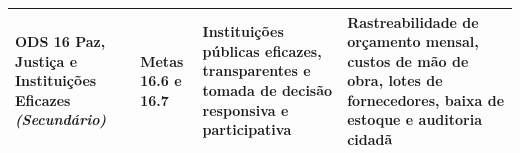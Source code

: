 \begin{table}[htb]
\begin{tabular}{L{2.7cm} L{1.8cm} L{4.2cm} L{5.5cm}}
\addlinespace
\textbf{ODS 16} \newline Paz, Justiça e Instituições Eficazes \newline \emph{(Secundário)} & Metas 16.6 e 16.7 & Instituições públicas eficazes, transparentes e tomada de decisão responsiva e participativa & Rastreabilidade de orçamento mensal, custos de mão de obra, lotes de fornecedores, baixa de estoque e auditoria cidadã \\
\bottomrule
\end{tabular}
\end{table}
